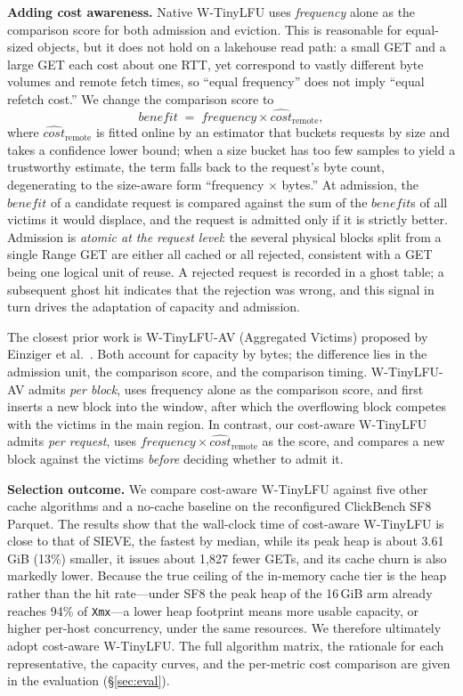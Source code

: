 \textbf{Adding cost awareness.}
Native W-TinyLFU uses \emph{frequency} alone as the comparison score for both
admission and eviction. This is reasonable for equal-sized objects, but it does
not hold on a lakehouse read path: a small GET and a large GET each cost about
one RTT, yet correspond to vastly different byte volumes and remote fetch times,
so ``equal frequency'' does not imply ``equal refetch cost.'' We change the
comparison score to
$$
  \mathit{benefit} \;=\; \mathit{frequency} \times \widehat{\mathit{cost}}_{\mathrm{remote}},
$$
where $\widehat{\mathit{cost}}_{\mathrm{remote}}$ is fitted online by an
estimator that buckets requests by size and takes a confidence lower bound;
when a size bucket has too few samples to yield a trustworthy estimate, the
term falls back to the request's byte count, degenerating to the size-aware
form ``frequency $\times$ bytes.'' At admission, the $\mathit{benefit}$ of a
candidate request is compared against the sum of the $\mathit{benefit}$s of all
victims it would displace, and the request is admitted only if it is strictly
better. Admission is \emph{atomic at the request level}: the several physical
blocks split from a single Range GET are either all cached or all rejected,
consistent with a GET being one logical unit of reuse. A rejected request is
recorded in a ghost table; a subsequent ghost hit indicates that the rejection
was wrong, and this signal in turn drives the adaptation of capacity and
admission.

The closest prior work is W-TinyLFU-AV (Aggregated Victims) proposed by
Einziger et al.~\cite{wtinylfu_av}. Both account for capacity by bytes; the
difference lies in the admission unit, the comparison score, and the comparison
timing. W-TinyLFU-AV admits \emph{per block}, uses frequency alone as the
comparison score, and first inserts a new block into the window, after which
the overflowing block competes with the victims in the main region. In
contrast, our cost-aware W-TinyLFU admits \emph{per request}, uses
$\mathit{frequency} \times \widehat{\mathit{cost}}_{\mathrm{remote}}$ as the
score, and compares a new block against the victims \emph{before} deciding
whether to admit it.

\textbf{Selection outcome.}
We compare cost-aware W-TinyLFU against five other cache algorithms and a
no-cache baseline on the reconfigured ClickBench SF8 Parquet. The results show
that the wall-clock time of cost-aware W-TinyLFU is close to that of SIEVE, the
fastest by median, while its peak heap is about 3.61\,GiB (13\%) smaller, it
issues about 1{,}827 fewer GETs, and its cache churn is also markedly lower.
Because the true ceiling of the in-memory cache tier is the heap rather than
the hit rate---under SF8 the peak heap of the 16\,GiB arm already reaches 94\%
of \texttt{Xmx}---a lower heap footprint means more usable capacity, or higher
per-host concurrency, under the same resources. We therefore ultimately adopt
cost-aware W-TinyLFU. The full algorithm matrix, the rationale for each
representative, the capacity curves, and the per-metric cost comparison are
given in the evaluation (\S\ref{sec:eval}).